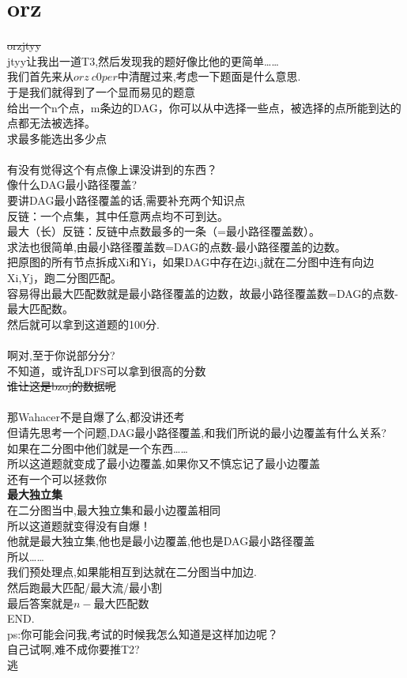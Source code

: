 \documentclass{article}
\begin{document}
\section{orz}
\sout{orzjtyy}\\
jtyy让我出一道T3,然后发现我的题好像比他的更简单……\\
我们首先来从$orz\ c0per$中清醒过来,考虑一下题面是什么意思.\\
于是我们就得到了一个显而易见的题意\\
给出一个n个点，m条边的DAG，你可以从中选择一些点，被选择的点所能到达的点都无法被选择。 \\
求最多能选出多少点\\
\\
有没有觉得这个有点像上课没讲到的东西？\\
像什么DAG最小路径覆盖?\\
要讲DAG最小路径覆盖的话,需要补充两个知识点\\
反链：一个点集，其中任意两点均不可到达。\\
最大（长）反链：反链中点数最多的一条（=最小路径覆盖数）。\\
求法也很简单,由最小路径覆盖数=DAG的点数-最小路径覆盖的边数。\\
把原图的所有节点拆成Xi和Yi，如果DAG中存在边i,j就在二分图中连有向边Xi,Yj，跑二分图匹配。\\
容易得出最大匹配数就是最小路径覆盖的边数，故最小路径覆盖数=DAG的点数-最大匹配数。\\
然后就可以拿到这道题的100分.\\
\\
啊对,至于你说部分分?\\
不知道，或许乱DFS可以拿到很高的分数\\
\sout{谁让这是bzoj的数据呢}\\
\\
那Wahacer不是自爆了么,都没讲还考\\
但请先思考一个问题,DAG最小路径覆盖,和我们所说的最小边覆盖有什么关系?\\
如果在二分图中他们就是一个东西……\\
所以这道题就变成了最小边覆盖,如果你又不慎忘记了最小边覆盖\\
还有一个可以拯救你\\
\textbf{最大独立集}\\
在二分图当中,最大独立集和最小边覆盖相同\\
所以这道题就变得没有自爆！\\
他就是最大独立集,他也是最小边覆盖,他也是DAG最小路径覆盖\\
所以……\\
我们预处理点,如果能相互到达就在二分图当中加边.\\
然后跑最大匹配/最大流/最小割\\
最后答案就是$n-$最大匹配数\\
END.\\
ps:你可能会问我,考试的时候我怎么知道是这样加边呢？\\自己试啊,难不成你要推T2?\\
逃~\\
\end{document}
